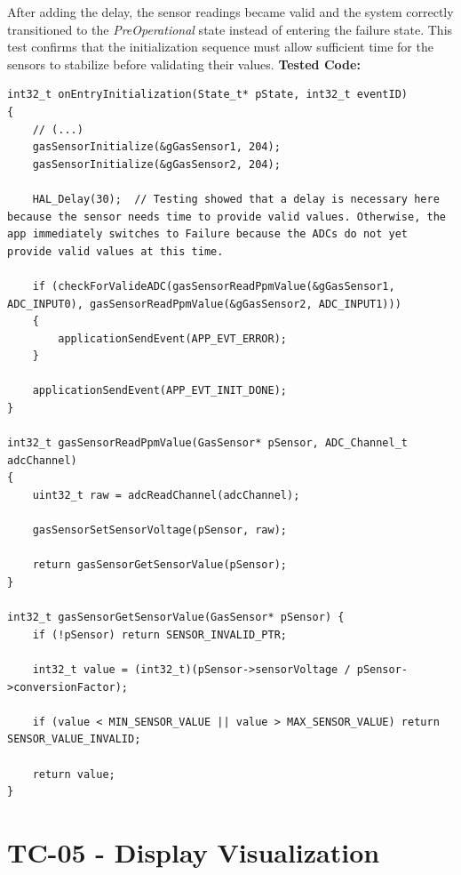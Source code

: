After adding the delay, the sensor readings became valid and the system correctly transitioned to the 
\textit{PreOperational} state instead of entering the failure state. 
This test confirms that the initialization sequence must allow sufficient time for the sensors to stabilize before validating their values.
\newpage
\textbf{Tested Code:}

\begin{lstlisting}[style=CStyle]
int32_t onEntryInitialization(State_t* pState, int32_t eventID)
{
    // (...)
    gasSensorInitialize(&gGasSensor1, 204);
    gasSensorInitialize(&gGasSensor2, 204);

    HAL_Delay(30);  // Testing showed that a delay is necessary here because the sensor needs time to provide valid values. Otherwise, the app immediately switches to Failure because the ADCs do not yet provide valid values at this time.

    if (checkForValideADC(gasSensorReadPpmValue(&gGasSensor1, ADC_INPUT0), gasSensorReadPpmValue(&gGasSensor2, ADC_INPUT1)))
    {
        applicationSendEvent(APP_EVT_ERROR);
    }

    applicationSendEvent(APP_EVT_INIT_DONE);
}

int32_t gasSensorReadPpmValue(GasSensor* pSensor, ADC_Channel_t adcChannel)
{
    uint32_t raw = adcReadChannel(adcChannel);

    gasSensorSetSensorVoltage(pSensor, raw);

    return gasSensorGetSensorValue(pSensor);
}

int32_t gasSensorGetSensorValue(GasSensor* pSensor) {
	if (!pSensor) return SENSOR_INVALID_PTR;

	int32_t value = (int32_t)(pSensor->sensorVoltage / pSensor->conversionFactor);

	if (value < MIN_SENSOR_VALUE || value > MAX_SENSOR_VALUE) return SENSOR_VALUE_INVALID;

	return value;
}
\end{lstlisting}

\newpage

\section{TC-05 - Display Visualization}

\renewcommand{\arraystretch}{1.4}

